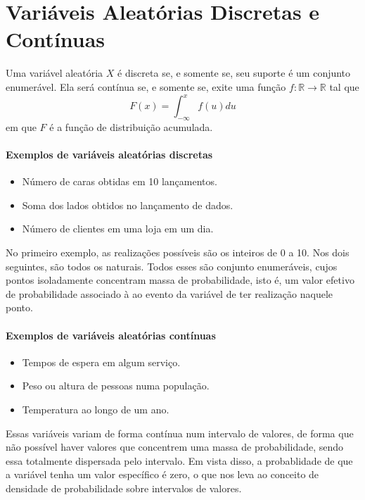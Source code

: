 \section{Variáveis Aleatórias Discretas e Contínuas}

\begin{def:tipo va}
Uma variável aleatória $X$ é discreta se, e somente se, seu suporte é um conjunto
enumerável. Ela será contínua se, e somente se, exite uma função $f: \mathbb{R} \to \mathbb{R}$
tal que
\[
	F(x) = \int_{-\infty}^x f(u)du
\]
em que $F$ é a função de distribuição acumulada.
\end{def:tipo va}

\paragraph{Exemplos de variáveis aleatórias discretas}
\begin{itemize}
	\item Número de caras obtidas em 10 lançamentos.
	\item Soma dos lados obtidos no lançamento de dados.
	\item Número de clientes em uma loja em um dia.
\end{itemize}
No primeiro exemplo, as realizações possíveis são os inteiros de 0 a 10. Nos dois seguintes,
são todos os naturais. Todos esses são conjunto enumeráveis, cujos pontos isoladamente
concentram massa de probabilidade, isto é, um valor efetivo de probabilidade associado à
ao evento da variável de ter realização naquele ponto.

\paragraph{Exemplos de variáveis aleatórias contínuas}
\begin{itemize}
	\item Tempos de espera em algum serviço.
	\item Peso ou altura de pessoas numa população.
	\item Temperatura ao longo de um ano.
\end{itemize}
Essas variáveis variam de forma contínua num intervalo de valores, de forma que não possível
haver valores que concentrem uma massa de probabilidade, sendo essa totalmente dispersada
pelo intervalo. Em vista disso, a probablidade de que a variável tenha um valor específico
é zero, o que nos leva ao conceito de densidade de probabilidade sobre intervalos de
valores.
